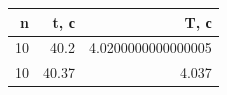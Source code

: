 \begin{tabular}{rrr}
\toprule
n & t, с & T, с \\
\midrule
10 & 40.2 & 4.0200000000000005 \\
10 & 40.37 & 4.037 \\
\bottomrule
\end{tabular}
